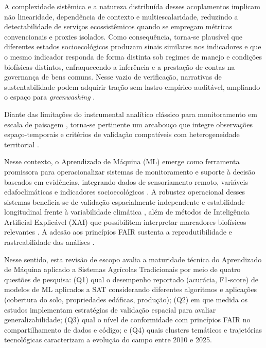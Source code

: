 A complexidade sistêmica e a natureza distribuída desses acoplamentos implicam não linearidade, dependência de contexto e multiescalaridade, reduzindo a detectabilidade de serviços ecossistêmicos quando se empregam métricas convencionais e proxies isolados. Como consequência, torna-se plausível que diferentes estados socioecológicos produzam sinais similares nos indicadores e que o mesmo indicador responda de forma distinta sob regimes de manejo e condições biofísicas distintos, enfraquecendo a inferência e a prestação de contas na governança de bens comuns. Nesse vazio de verificação, narrativas de sustentabilidade podem adquirir tração sem lastro empírico auditável, ampliando o espaço para \textit{greenwashing} \cite{Levin1998ComplexAdaptiveSystems,Gale2023}.

Diante das limitações do instrumental analítico clássico para monitoramento em escala de paisagem \cite{Liao2023,Weiss2020}, torna-se pertinente um arcabouço que integre observações espaço-temporais e critérios de validação compatíveis com heterogeneidade territorial \cite{Belgiu2016}. 

Nesse contexto, o Aprendizado de Máquina (ML) emerge como ferramenta promissora para operacionalizar sistemas de monitoramento e suporte à decisão baseados em evidências, integrando dados de sensoriamento remoto, variáveis edafoclimáticas e indicadores socioecológicos \cite{Mountrakis2011,Spyrou2025}. A robustez operacional desses sistemas beneficia-se de validação espacialmente independente e estabilidade longitudinal frente à variabilidade climática \cite{Kuhn2013}, além de métodos de Inteligência Artificial Explicável (XAI) que possibilitem interpretar marcadores biofísicos relevantes \cite{Rudin2019}. A adesão aos princípios FAIR sustenta a reprodutibilidade e rastreabilidade das análises \cite{Wilkinson2016}.

Nesse sentido, esta revisão de escopo avalia a maturidade técnica do Aprendizado de Máquina aplicado a Sistemas Agrícolas Tradicionais por meio de quatro questões de pesquisa: (Q1) qual o desempenho reportado (acurácia, F1-score) de modelos de ML aplicados a SAT considerando diferentes algoritmos e aplicações (cobertura do solo, propriedades edáficas, produção); (Q2) em que medida os estudos implementam estratégias de validação espacial para avaliar generalizabilidade; (Q3) qual o nível de conformidade com princípios FAIR no compartilhamento de dados e código; e (Q4) quais clusters temáticos e trajetórias tecnológicas caracterizam a evolução do campo entre 2010 e 2025.


